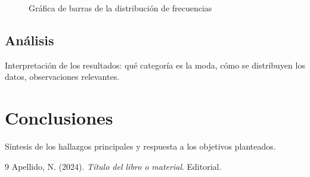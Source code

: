\documentclass[11pt,letterpaper]{article}
\begin{document}
\begin{figure}[H]
    \centering
    \caption{Gráfica de barras de la distribución de frecuencias}
    \label{fig:grafica}
\end{figure}

\subsection{Análisis}
Interpretación de los resultados: qué categoría es la moda, cómo se distribuyen los
datos, observaciones relevantes.

\section{Conclusiones}
Síntesis de los hallazgos principales y respuesta a los objetivos planteados.

\begin{thebibliography}{9}
Apellido, N. (2024). \textit{Título del libro o material}. Editorial.
\end{thebibliography}
\end{document}

